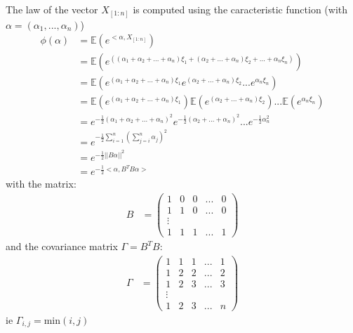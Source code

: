 {The law of the vector $X_{[1:n]}$ is computed using the caracteristic function (with $\alpha = (\alpha_1,...,\alpha_n)$)
\begin{align}
    \phi(\alpha) &= \mathbb{E}(e^{<\alpha, X_{[1:n]}}) \\
    &= \mathbb{E}(e^{((\alpha_1 + \alpha_2 + ... + \alpha_n)\xi_1 + (\alpha_2 + ... + \alpha_n)\xi_2 + ... + \alpha_n \xi_n)}) \\
    &= \mathbb{E}(e^{(\alpha_1 + \alpha_2 + ... + \alpha_n)\xi_1}e^{(\alpha_2 + ... + \alpha_n)\xi_2}...e^{\alpha_n\xi_n}) \\
    &= \mathbb{E}(e^{(\alpha_1 + \alpha_2 + ... + \alpha_n)\xi_1}) \mathbb{E}(e^{(\alpha_2 + ... + \alpha_n)\xi_2}) ... \mathbb{E}(e^{\alpha_n\xi_n}) \\
    &= e^{-\frac{1}{2}(\alpha_1 + \alpha_2 + ... + \alpha_n)^{2}} e^{-\frac{1}{2}(\alpha_2 + ... + \alpha_n)^{2}} ... e^{-\frac{1}{2}\alpha_n^{2}} \\
    &= e^{-\frac{1}{2}\sum_{i=1}^{n}(\sum_{j=i}^{n}\alpha_j)^{2}} \\
    &= e^{-\frac{1}{2}\vert\vert B \alpha \vert\vert ^{2}} \\
    &= e^{-\frac{1}{2} < \alpha, B^{T}B \alpha >}
\end{align}
with the matrix:
\begin{align}
    B &= \begin{pmatrix}
        1 & 0 & 0 & ... & 0 \\
        1 & 1 & 0 & ... & 0 \\
        \vdots \\
        1 & 1 & 1 & ... & 1
    \end{pmatrix}
\end{align}
and the covariance matrix $\Gamma = B^{T}B$:
\begin{align}
    \Gamma &= \begin{pmatrix}
        1 & 1 & 1 & ... & 1 \\
        1 & 2 & 2 & ... & 2 \\
        1 & 2 & 3 & ... & 3 \\
        \vdots \\
        1 & 2 & 3 & ... & n
    \end{pmatrix}
\end{align}
ie $\Gamma_{i,j} = \text{min}(i,j)$
}

